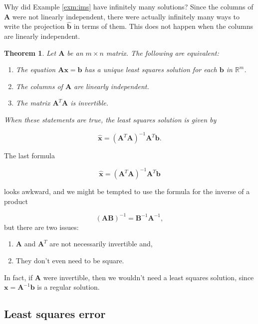 \documentclass[
]{book}
\newtheorem{theorem}{Theorem}[chapter]
\theoremstyle{definition}
\theoremstyle{definition}
\theoremstyle{definition}
\theoremstyle{definition}
\theoremstyle{remark}
\begin{document}
Why did Example \ref{exm:ims} have infinitely many solutions? Since the columns of \(\mathbf{A}\) were not linearly independent, there were actually infinitely many ways to write the projection \(\hat{\mathbf{b}}\) in terms of them. This does not happen when the columns are linearly independent.

\begin{theorembox}

\begin{theorem}
Let \(\mathbf{A}\) be an \(m\times n\) matrix. The following are equivalent:

\begin{enumerate}
\def\labelenumi{\arabic{enumi}.}
\item
  The equation \(\mathbf{A}\mathbf{x}=\mathbf{b}\) has a unique least squares solution for each \(\mathbf{b}\) in \(\mathbb{R}^m\).
\item
  The columns of \(\mathbf{A}\) are linearly independent.
\item
  The matrix \(\mathbf{A}^T\mathbf{A}\) is invertible.
\end{enumerate}

When these statements are true, the least squares solution is given by

\[\hat{\mathbf{x}}=(\mathbf{A}^T\mathbf{A})^{-1}\mathbf{A}^T\mathbf{b}.\]
\end{theorem}

\end{theorembox}

The last formula

\[\hat{\mathbf{x}}=(\mathbf{A}^T\mathbf{A})^{-1}\mathbf{A}^T\mathbf{b}\]

looks awkward, and we might be tempted to use the formula for the inverse of a product

\[(\mathbf{A}\mathbf{B})^{-1}=\mathbf{B}^{-1}\mathbf{A}^{-1},\]
but there are two issues:

\begin{enumerate}
\def\labelenumi{\arabic{enumi}.}
\item
  \(\mathbf{A}\) and \(\mathbf{A}^T\) are not necessarily invertible and,
\item
  They don't even need to be square.
\end{enumerate}

In fact, if \(\mathbf{A}\) were invertible, then we wouldn't need a least squares solution, since \(\mathbf{x}=\mathbf{A}^{-1}\mathbf{b}\) is a regular solution.

\subsection*{Least squares error}\label{least-squares-error}
\end{document}
